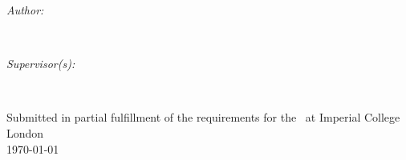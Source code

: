 \begin{titlepage}
\begin{minipage}{0.4\textwidth}
\begin{flushleft} \large
\emph{Author:}\\
\reportauthor %
\end{flushleft}
\end{minipage}
~
\begin{minipage}{0.4\textwidth}
\begin{flushright} \large
\emph{Supervisor(s):} \\
\supervisor %
\end{flushright}
\end{minipage}\\[2cm]
\makeatother

\vfill %
Submitted in partial fulfillment of the requirements for the \degreetype~at Imperial College London\\[0.5cm]

\makeatletter
{\large \today}\\[2cm] %
\makeatother

\end{titlepage}